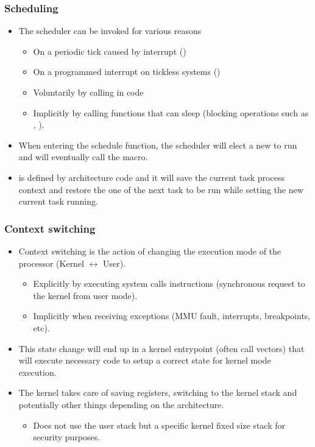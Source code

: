 \begin{frame}[fragile]
  \frametitle{Scheduling}
  \begin{itemize}
    \item The scheduler can be invoked for various reasons
    \begin{itemize}
      \item On a periodic tick caused by interrupt ()
      \item On a programmed interrupt on tickless systems ()
      \item Voluntarily by calling  in code
      \item Implicitly by calling functions that can sleep (blocking
            operations such as , ).
    \end{itemize}
    \item When entering the schedule function, the scheduler will elect a new
           to run and will eventually call the
           macro.
    \item {} is defined by architecture code and it will save
          the current task process context and restore the one of the next task
          to be run while setting the new current task running.
  \end{itemize}
\end{frame}



\begin{frame}
  \frametitle{Context switching}
  \begin{itemize}
    \item Context switching is the action of changing the execution mode of the
          processor (Kernel $\leftrightarrow$ User).
    \begin{itemize}
      \item Explicitly by executing system calls instructions (synchronous
            request to the kernel from user mode).
      \item Implicitly when receiving exceptions (MMU fault, interrupts,
            breakpoints, etc).
    \end{itemize}
    \item This state change will end up in a kernel entrypoint (often call vectors)
          that will execute necessary code to setup a correct state for kernel
          mode execution.
    \item The kernel takes care of saving registers, switching to the kernel
          stack and potentially other things depending on the architecture.
    \begin{itemize}
      \item Does not use the user stack but a specific kernel fixed size stack
            for security purposes.
    \end{itemize}
  \end{itemize}
\end{frame}


